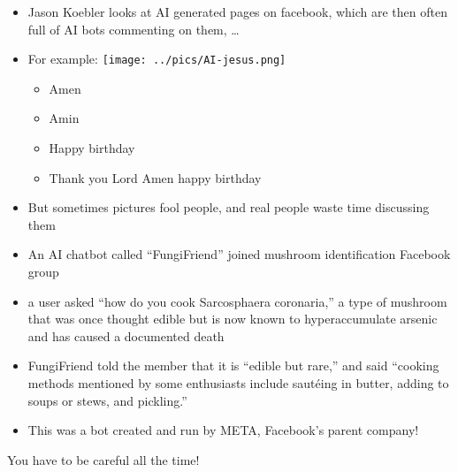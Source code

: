 \documentclass[a4paper,landscape,headrule,footrule,xetex]{foils}
\begin{document}

\begin{itemize}
\item Jason Koebler looks at AI generated pages on facebook, which are then often full of AI bots commenting on them, \ldots

\item For example: \texttt{[image: ../pics/AI-jesus.png]}
  \begin{itemize}
  \item Amen 
  \item Amin 
  \item Happy birthday 
  \item Thank you Lord Amen happy birthday
  \end{itemize}
\item But sometimes pictures fool people, and real people waste time discussing them
  
\end{itemize}


\begin{itemize}
\item An AI chatbot called “FungiFriend” joined mushroom identification Facebook group
\item a user asked “how do you cook Sarcosphaera coronaria,” a type of mushroom that was once thought edible but is now known to hyperaccumulate arsenic and has caused a documented death
\item FungiFriend told the member that it is “edible but rare,” and said “cooking methods mentioned by some enthusiasts include sautéing in butter, adding to soups or stews, and pickling.”
\item This was a bot created and run by META, Facebook's parent company!
\end{itemize}
%
\begin{center}
  \large You have to be careful all the time!
\end{center}

\end{document}
